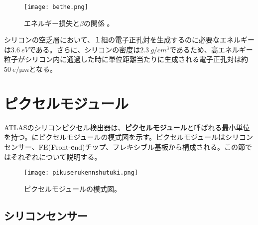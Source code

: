 \begin{figure}[tbp]
  \centering
  \texttt{[image: bethe.png]}
  \caption[エネルギー損失と$\beta$の関係。]{エネルギー損失と$\beta$の関係 \cite{bethe}。}
  \label{fig:bethe}
\end{figure}

シリコンの空乏層において、１組の電子正孔対を生成するのに必要なエネルギーは$3.6\ \si{eV}$である。さらに、シリコンの密度は$2.3\ \si{g/cm^3}$であるため、高エネルギー粒子がシリコン内に通過した時に単位距離当たりに生成される電子正孔対は約$50\ \si{e / \micro m}$となる。


\section{ピクセルモジュール}
\label{sec:pixelkenshutuki}

ATLASのシリコンピクセル検出器は、\textbf{ピクセルモジュール}と呼ばれる最小単位を持つ。にピクセルモジュールの模式図を示す。ピクセルモジュールはシリコンセンサー、FE(\textbf{F}ront-\textbf{e}nd)チップ、フレキシブル基板から構成される。この節ではそれぞれについて説明する。

\begin{figure}[tbp]
  \centering
  \texttt{[image: pikuserukennshutuki.png]}
  \caption[ピクセルモジュールの模式図]{ピクセルモジュールの模式図。}
  \label{fig:pikuserukennshutuki}
\end{figure}

\subsection{シリコンセンサー}
\label{sec:silicon}


